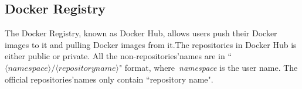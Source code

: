 



\subsection{Docker Registry}

The Docker Registry, known as Docker Hub, allows users push their Docker images to it and pulling Docker images from it.The repositories in Docker Hub is either public or private. All the non-repositories'names are in ``$\langle namespace\rangle/\langle repository name \rangle$" format, where~\textit{namespace} is the user name. The official repositories'names only contain ``repository name".





